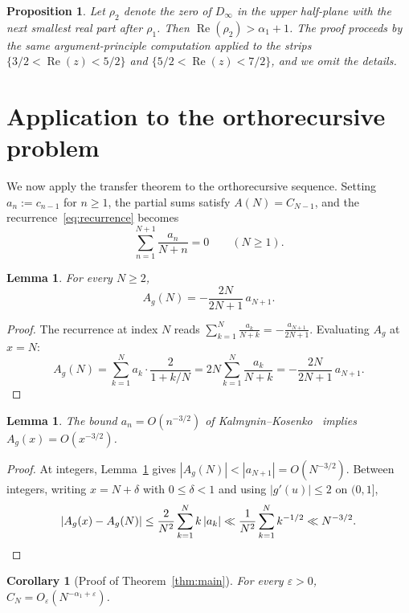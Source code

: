 \documentclass[11pt]{amsart}
\newtheorem{lemma}[theorem]{Lemma}
\newtheorem{proposition}[theorem]{Proposition}
\newtheorem{corollary}[theorem]{Corollary}
\theoremstyle{definition}
\theoremstyle{remark}
\newcommand{\eps}{\varepsilon}
\newcommand{\Real}{\operatorname{Re}}
\begin{document}
\begin{proposition}\label{prop:alpha2}
Let $\rho_2$ denote the zero of $D_\infty$ in the upper half-plane with the next smallest real part after $\rho_1$. Then $\Real(\rho_2) > \alpha_1 + 1$. The proof proceeds by the same argument-principle computation applied to the strips $\{3/2 < \Real(z) < 5/2\}$ and $\{5/2 < \Real(z) < 7/2\}$, and we omit the details.
\end{proposition}


\section{Application to the orthorecursive problem}\label{sec:application}

We now apply the transfer theorem to the orthorecursive sequence. Setting $a_n := c_{n-1}$ for $n \geq 1$, the partial sums satisfy $A(N) = C_{N-1}$, and the recurrence~\eqref{eq:recurrence} becomes
$$
\sum_{n=1}^{N+1} \frac{a_n}{N+n} = 0 \qquad (N \geq 1).
$$

\begin{lemma}\label{lem:Ag_integer}
For every $N \geq 2$,
$$
A_g(N) = -\frac{2N}{2N+1}\, a_{N+1}.
$$
\end{lemma}

\begin{proof}
The recurrence at index $N$ reads $\sum_{k=1}^{N} \frac{a_k}{N+k} = -\frac{a_{N+1}}{2N+1}$. Evaluating $A_g$ at $x = N$:
$$
A_g(N) = \sum_{k=1}^{N} a_k \cdot \frac{2}{1+k/N} = 2N \sum_{k=1}^{N} \frac{a_k}{N+k} = -\frac{2N}{2N+1}\, a_{N+1}.
$$
\end{proof}

\begin{lemma}\label{lem:Ag_bound}
The bound $a_n = O(n^{-3/2})$ of Kalmynin--Kosenko~\cite{KalKos} implies $A_g(x) = O(x^{-3/2})$.
\end{lemma}

\begin{proof}
At integers, Lemma~\ref{lem:Ag_integer} gives $|A_g(N)| < |a_{N+1}| = O(N^{-3/2})$. Between integers, writing $x = N + \delta$ with $0 \leq \delta < 1$ and using $|g'(u)| \leq 2$ on $(0,1]$,
$$
|A_g(x) - A_g(N)| \leq \frac{2}{N^2} \sum_{k=1}^{N} k\, |a_k| \ll \frac{1}{N^2} \sum_{k=1}^{N} k^{-1/2} \ll N^{-3/2}. \qedhere
$$
\end{proof}

\begin{corollary}[Proof of Theorem~\ref{thm:main}]\label{cor:main}
For every $\eps > 0$, $C_N = O_\eps(N^{-\alpha_1+\eps})$.
\end{corollary}
\end{document}
